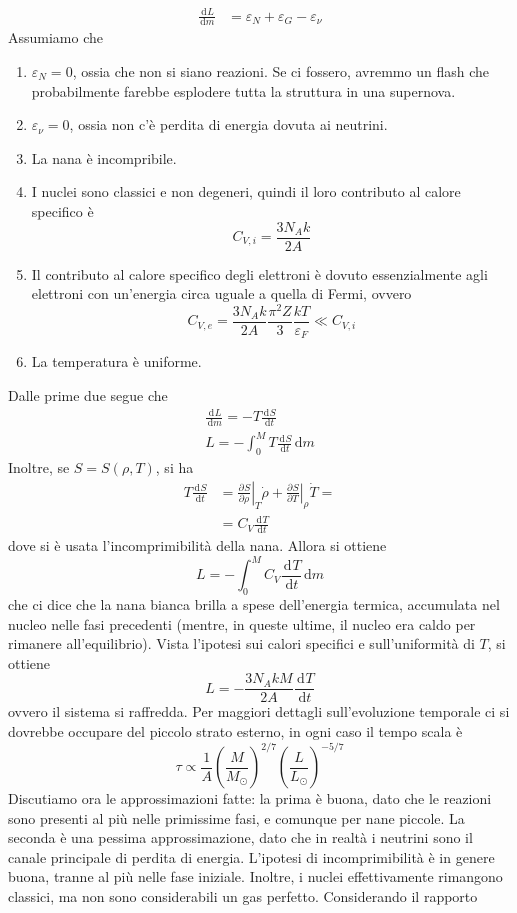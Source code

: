 \documentclass[a4paper,11pt]{article}
\renewcommand{\d}{\mathrm{d}} %
\newcommand{\der}[3][]{\frac{\d ^{#1}#2}{\d {#3}^{#1}}} %
\newcommand{\pder}[3][]{\frac{\partial ^{#1}#2}{\partial {#3}^{#1}}} %
\newcommand{\s}{_\odot}
\renewcommand{\d}{\,\mathrm{d}}
\theoremstyle{theorem}
\theoremstyle{definition}
\begin{document}
\begin{itemize}
		\begin{align*}
		\der{L}{m}&=\varepsilon_N+\varepsilon_G-\varepsilon_\nu
		\end{align*}
		Assumiamo che
		\begin{enumerate}
			\item $\varepsilon_N=0$, ossia che non si siano reazioni. Se ci fossero, avremmo un flash che probabilmente farebbe esplodere tutta la struttura in una supernova.
			\item $\varepsilon_\nu=0$, ossia non c'è perdita di energia dovuta ai neutrini.
			\item La nana è incompribile.
			\item I nuclei sono classici e non degeneri, quindi il loro contributo al calore specifico è
			\[C_{V,i}=\frac{3N_Ak}{2A}\]
			\item Il contributo al calore specifico degli elettroni è dovuto essenzialmente agli elettroni con un'energia circa uguale a quella di Fermi, ovvero
			\[C_{V,e}=\frac{3N_Ak}{2A}\frac{\pi^2Z}{3}\frac{kT}{\varepsilon_F}\ll C_{V,i}\]
			\item La temperatura è uniforme.
		\end{enumerate}
		Dalle prime due segue che
		\begin{align*}
			\der{L}{m}=-T\der{S}{t}\\
			L=-\int_{0}^{M}T\der{S}{t}\d m
		\end{align*}
		Inoltre, se $S=S(\rho,T)$, si ha
		\begin{align*}T\der{S}{t}&=\left.\pder{S}{\rho}\right|_{T}\dot{\rho}+\left.\pder{S}{T}\right|_{\rho}\dot{T}=\\&=C_V\der{T}{t}\end{align*}
		dove si è usata l'incomprimibilità della nana. Allora si ottiene
		\[L=-\int_{0}^{M}C_V\der{T}{t}\d m\]
		che ci dice che la nana bianca brilla a spese dell'energia termica, accumulata nel nucleo nelle fasi precedenti (mentre, in queste ultime, il nucleo era caldo per rimanere all'equilibrio). Vista l'ipotesi sui calori specifici e sull'uniformità di $T$, si ottiene
		\[L=-\frac{3N_AkM}{2A}\der{T}{t}\]
		ovvero il sistema si raffredda. Per maggiori dettagli sull'evoluzione temporale ci si dovrebbe occupare del piccolo strato esterno, in ogni caso il tempo scala è
		\[\tau\propto\frac{1}{A}\left(\frac{M}{M\s}\right)^{2/7}\left(\frac{L}{L\s}\right)^{-5/7}\]
		Discutiamo ora le approssimazioni fatte: la prima è buona, dato che le reazioni sono presenti al più nelle primissime fasi, e comunque per nane piccole. La seconda è una pessima approssimazione, dato che in realtà i neutrini sono il canale principale di perdita di energia. L'ipotesi di incomprimibilità è in genere buona, tranne al più nelle fase iniziale. Inoltre, i nuclei effettivamente rimangono classici, ma non sono considerabili un gas perfetto. Considerando il rapporto

\end{itemize}
\end{document}
